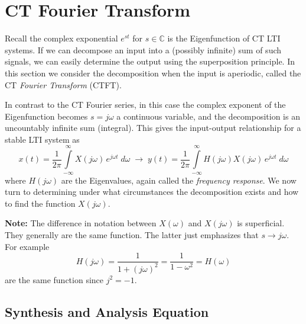 \chapter{CT Fourier Transform}

Recall the complex exponential $e^{st}$ for $s\in\mathbb{C}$ is the Eigenfunction of CT LTI systems. If we can decompose an input into a (possibly infinite) sum of such signals, we can easily determine the output using the superposition principle. In this section we consider the decomposition when the input is aperiodic, called the CT \emph{Fourier Transform} (CTFT).

In contrast to the CT Fourier series, in this case the complex exponent of the Eigenfunction becomes $s = j\omega$ a continuous variable, and the decomposition is an uncountably infinite sum (integral). This gives the input-output relationship for a stable LTI system as
\[
x(t) = \frac{1}{2\pi}\int\limits_{-\infty}^{\infty} X(j\omega) \, e^{j \omega t}\; d\omega \;\longrightarrow\; y(t) = \frac{1}{2\pi}\int\limits_{-\infty}^{\infty} H(j\omega) X(j\omega) \, e^{j \omega t}\; d\omega
\]
where $H(j \omega)$ are the Eigenvalues, again called the \emph{frequency response}. We now turn to determining under what circumstances the decomposition exists and how to find the function $X(j\omega)$.

\textbf{Note:} The difference in notation between $X(\omega)$ and $X(j\omega)$ is superficial. They generally are the same function. The latter just emphasizes that $s \rightarrow j\omega$. For example
\[
H(j\omega) = \frac{1}{1+(j\omega)^2} = \frac{1}{1-\omega^2} = H(\omega) 
\]
are the same function since $j^2 = -1$.

\section{Synthesis and Analysis Equation}

